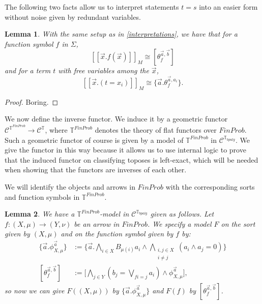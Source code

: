 \documentclass[a4paper]{amsproc}
\theoremstyle{plain}
\newtheorem{lemma}{Lemma}[section]
\theoremstyle{definition}
\theoremstyle{remark}
\numberwithin{equation}{section}
\newcommand{\ldoub}{[\![ }
\newcommand{\rdoub}{]\!]}
\begin{document}
The following two facts allow us to interpret statements $t = s$ into an easier form without noise given by redundant variables.

\begin{lemma} With the same setup as in \ref{interpretations}, we have that for a function symbol $f$ in $\Sigma$,
\[
\ldoub \vec{x} . f(\vec{x}) \rdoub_M \cong [ \theta_f^{\vec{a}, \vec{b}} ]
\]
and for a term $t$ with free variables among the $\vec{x}$,
\[
\ldoub \vec{x} . (t=x_i) \rdoub_M \cong \{\vec{a} . \theta_f^{\vec{a},a_i} \} .
\]
\end{lemma}

\begin{proof}
Boring.
\end{proof}

We now define the inverse functor. We induce it by a geometric functor $\mathcal{C}^{\mathbb{T}^{FinProb}} \to \mathcal{C}^{\mathbb{T}}$, where $\mathbb{T}^{FinProb}$ denotes the theory of flat functors over $FinProb$. Such a geometric functor of course is given by a model of $\mathbb{T}^{FinProb}$ in $\mathcal{C}^{\mathbb{T}_{bpalg}}$. We give the functor in this way because it allows us to use internal logic to prove that the induced functor on classifying toposes is left-exact, which will be needed when showing that the functors are inverses of each other.

We will identify the objects and arrows in $FinProb$ with the corresponding sorts and function symbols in $\mathbb{T}^{FinProb}$.

\begin{lemma} \label{inverse}
We have a $\mathbb{T}^{FinProb}$-model in $\mathcal{C}^{\mathbb{T}_{bpalg}}$ given as follows. Let $f: (X,\mu) \to (Y, \nu)$ be an arrow in $FinProb$. We specify a model $F$ on the sort given by $(X,\mu)$ and on the function symbol given by $f$ by:
\begin{align*}
\{\vec{a} . \phi_{X,\mu}^{\vec{a}}\} &:= \Bigg \{ \vec{a} . \bigwedge_{i \in X} B_{\mu(i)} a_i \wedge \bigwedge_{\substack{i,j \in X \\ i \neq j}} (a_i \wedge a_j = 0) \Bigg \} \\
[\theta_f^{\vec{a}, \vec{b}}] &:= \Bigg [ \bigwedge_{j \in Y} (b_j = \bigvee_{f i = j} a_i) \wedge \phi_{X,\mu}^{\vec{a}} \Bigg] ,
\end{align*}
so now we can give $F((X,\mu))$ by $\{\vec{a} . \phi_{X,\mu}^{\vec{a}}\}$ and $F(f)$ by $[\theta_f^{\vec{a}, \vec{b}}]$.
\end{lemma}
\end{document}
